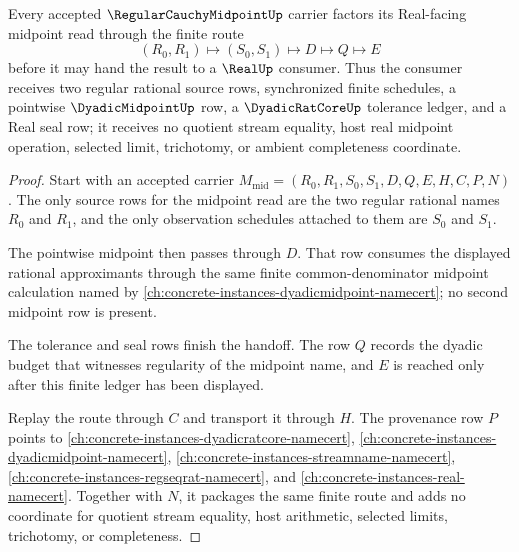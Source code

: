 \begin{theorem}
\label{thm:regular-cauchy-midpoint-real-seal-handoff}
Every accepted $\RegularCauchyMidpointUp$ carrier factors its Real-facing midpoint read through the finite route
$$
(R_0,R_1)\longmapsto(S_0,S_1)\longmapsto D\longmapsto Q\longmapsto E
$$
before it may hand the result to a $\RealUp$ consumer. Thus the consumer receives two regular rational source rows, synchronized finite schedules, a pointwise $\DyadicMidpointUp$ row, a $\DyadicRatCoreUp$ tolerance ledger, and a Real seal row; it receives no quotient stream equality, host real midpoint operation, selected limit, trichotomy, or ambient completeness coordinate.
\end{theorem}
\begin{proof}
Start with an accepted carrier $M_{\mathrm{mid}}=(R_0,R_1,S_0,S_1,D,Q,E,H,C,P,N)$. The only source rows for the midpoint read are the two regular rational names $R_0$ and $R_1$, and the only observation schedules attached to them are $S_0$ and $S_1$.

The pointwise midpoint then passes through $D$. That row consumes the displayed rational approximants through the same finite common-denominator midpoint calculation named by \autoref{ch:concrete-instances-dyadicmidpoint-namecert}; no second midpoint row is present.

The tolerance and seal rows finish the handoff. The row $Q$ records the dyadic budget that witnesses regularity of the midpoint name, and $E$ is reached only after this finite ledger has been displayed.

Replay the route through $C$ and transport it through $H$. The provenance row $P$ points to \autoref{ch:concrete-instances-dyadicratcore-namecert}, \autoref{ch:concrete-instances-dyadicmidpoint-namecert}, \autoref{ch:concrete-instances-streamname-namecert}, \autoref{ch:concrete-instances-regseqrat-namecert}, and \autoref{ch:concrete-instances-real-namecert}. Together with $N$, it packages the same finite route and adds no coordinate for quotient stream equality, host arithmetic, selected limits, trichotomy, or completeness.
\end{proof}

